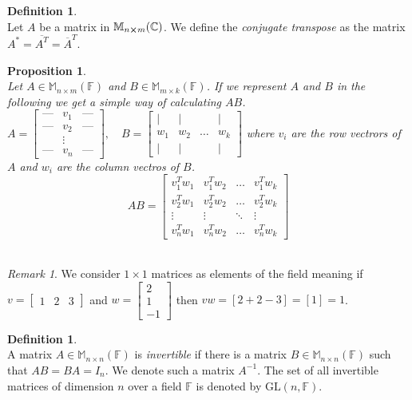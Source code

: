 \documentclass[12pt]{article}
\newtheorem{prop}[theorem]{Proposition}
\theoremstyle{definition}
\newtheorem{definition}[theorem]{Definition}
\theoremstyle{remark}
\newtheorem*{remark}{Remark}
\theoremstyle{plain}
\begin{document}
\begin{definition}\leavevmode \\
	Let $A$ be a matrix in $\mathbb{M}_{n\cross m}(\mathbb{C})$. We define the \textit{conjugate transpose} as the matrix $A^*=\overline{A^T}=\overline{A}^T$.	
\end{definition}
\begin{prop}\leavevmode \\
 Let $A\in \mathbb{M}_{n\times m}(\mathbb{F})$ and $B \in  \mathbb{M}_{m\times k}(\mathbb{F})$. If we represent $A$ and $B$ in the following we get a simple way of calculating $AB$.\\
 
 
$A = \begin{bmatrix} 
\text{---} & v_1 & \text{---} \\ 
\text{---} & v_2 & \text{---} \\ 
& \vdots & \\ 
\text{---} & v_n & \text{---} 
\end{bmatrix}, \quad
B = \begin{bmatrix} 
\mid & \mid & & \mid \\ 
w_1 & w_2 & \dots & w_k \\ 
\mid & \mid & & \mid 
\end{bmatrix}$ where $v_i$ are the row vectrors of $A$ and $w_i$ are the column vectros of $B$. $$AB = \begin{bmatrix} 
v_1^T w_1 & v_1^T w_2 & \dots & v_1^T w_k \\ 
v_2^T w_1 & v_2^T w_2 & \dots & v_2^T w_k \\ 
\vdots & \vdots & \ddots & \vdots \\ 
v_n^T w_1 & v_n^T w_2 & \dots & v_n^T w_k 
\end{bmatrix}$$ \\
\end{prop}
\begin{remark}
   We consider $1\times 1$ matrices as elements of the field meaning if $v=\begin{bmatrix}
       1& 2 & 3
   \end{bmatrix} $ and $w=\begin{bmatrix}
       2 \\1 \\-1
   \end{bmatrix}$ then $vw=[2+2-3]=[1]= 1$.
\end{remark}
\begin{definition}\leavevmode \\
	A matrix $A\in	\mathbb{M}_{n\times n}(\mathbb{F})$  is \textit{invertible} if there is a matrix $B\in \mathbb{M}_{n\times n}(\mathbb{F})$ such that $AB=BA=I_n$.
We denote such a matrix $A^{-1}$. The set of all invertible matrices of dimension $ n $ over a field $ \mathbb{F} $ is denoted by $ \mathrm{GL}(n,\mathbb{F}) $.
\end{definition}
\end{document}
